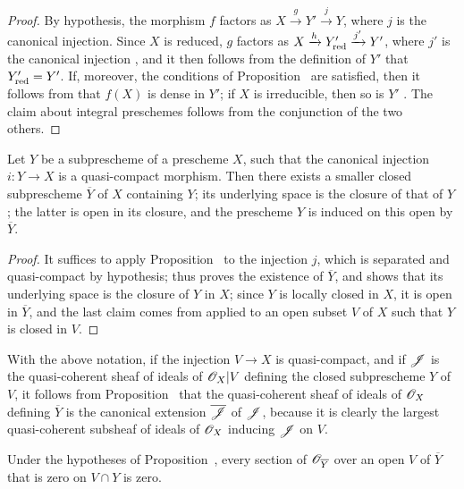 \begin{proof}
By hypothesis, the morphism $f$ factors as $X\xrightarrow{g}Y'\xrightarrow{j}Y$, where $j$ is the canonical injection.
Since $X$ is reduced, $g$ factors as $X\xrightarrow{h}Y'_{\mathrm{red}}\xrightarrow{j'}Y'$, where $j'$ is the canonical injection , and it then follows from the definition of $Y'$ that $Y'_{\mathrm{red}}=Y'$.
If, moreover, the conditions of Proposition~ are satisfied, then it follows from  that $f(X)$ is dense in $Y'$; if $X$ is irreducible, then so is $Y'$ .
The claim about integral preschemes follows from the conjunction of the two others.
\end{proof}

\begin{proposition}[9.5.10]
\label{I.9.5.10}
Let $Y$ be a subprescheme of a prescheme $X$, such that the canonical injection $i:Y\to X$ is a quasi-compact morphism.
Then there exists a smaller closed subprescheme $\overline{Y}$ of $X$ containing $Y$; its underlying space is the closure of that of $Y$; the latter is open in its closure, and the prescheme $Y$ is induced on this open by $\overline{Y}$.
\end{proposition}

\begin{proof}
It suffices to apply Proposition~ to the injection $j$, which is separated  and quasi-compact by hypothesis;  thus proves the existence of $\overline{Y}$, and  shows that its underlying space is the closure of $Y$ in $X$; since $Y$ is locally closed in $X$, it is open in $\overline{Y}$, and the last claim comes from  applied to an open subset $V$ of $X$ such that $Y$ is closed in $V$.
\end{proof}

With the above notation, if the injection $V\to X$ is quasi-compact, and if $\mathscr{J}$ is the quasi-coherent sheaf of ideals of $\mathscr{O}_X|V$ defining the closed subprescheme $Y$ of $V$, it follows from Proposition~ that the quasi-coherent sheaf of ideals of $\mathscr{O}_X$ defining $\overline{Y}$ is the canonical extension  $\overline{\mathscr{J}}$ of $\mathscr{J}$, because it is clearly the largest quasi-coherent subsheaf of ideals of $\mathscr{O}_X$ inducing $\mathscr{J}$ on $V$.

\begin{corollary}[9.5.11]
\label{I.9.5.11}
Under
the hypotheses of Proposition~, every section of $\mathscr{O}_{\overline{Y}}$ over an open $V$ of $\overline{Y}$ that is zero on $V\cap Y$ is zero.
\end{corollary}

